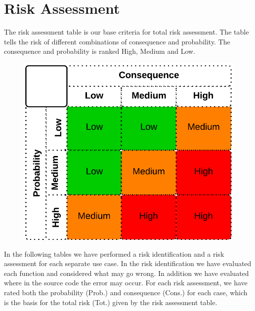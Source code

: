 \chapter{Risk Assessment}

	The risk assessment table is our base criteria for total risk assessment. The table tells 
	the risk of different combinations of consequence and probability. The consequence and 
	probability is ranked High, Medium and Low. 

		\begin{figure}[H]
			\includegraphics[scale=0.3]{pics/risk.png}
		\end{figure}

	In the following tables we have performed a risk identification and a risk assessment for 
	each separate use case. In the risk identification we have evaluated each function and 
	considered what may go wrong. In addition we have evaluated where in the source code the 
	error may occur. For each risk assessment, we have rated both the probability (Prob.) and consequence (Cons.) for each case, which is the basis for the total risk (Tot.) given by the risk assessment table.

	\clearpage


